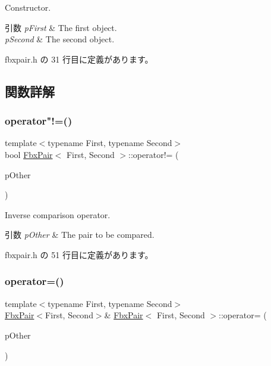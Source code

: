 Constructor. 
\begin{DoxyParams}{引数}
{\em p\+First} & The first object. \\
\hline
{\em p\+Second} & The second object. \\
\hline
\end{DoxyParams}


 fbxpair.\+h の 31 行目に定義があります。



\subsection{関数詳解}
\mbox{\label{class_fbx_pair_a6a08f9caa08c3bdd093951eeeaed31bf}} 
\subsubsection{\texorpdfstring{operator"!=()}{operator!=()}}
{\footnotesize\ttfamily template$<$typename First, typename Second$>$ \\
bool \hyperlink{class_fbx_pair}{Fbx\+Pair}$<$ First, Second $>$\+::operator!= (\begin{DoxyParamCaption}\item[{const \hyperlink{class_fbx_pair}{Fbx\+Pair}$<$ First, Second $>$ \&}]{p\+Other }\end{DoxyParamCaption})\hspace{0.3cm}{\ttfamily [inline]}}

Inverse comparison operator. 
\begin{DoxyParams}{引数}
{\em p\+Other} & The pair to be compared. \\
\hline
\end{DoxyParams}


 fbxpair.\+h の 51 行目に定義があります。

\mbox{\label{class_fbx_pair_ab645f08678477ba9b74c08ff5d61bf52}} 
\subsubsection{\texorpdfstring{operator=()}{operator=()}}
{\footnotesize\ttfamily template$<$typename First, typename Second$>$ \\
\hyperlink{class_fbx_pair}{Fbx\+Pair}$<$First, Second$>$\& \hyperlink{class_fbx_pair}{Fbx\+Pair}$<$ First, Second $>$\+::operator= (\begin{DoxyParamCaption}\item[{const \hyperlink{class_fbx_pair}{Fbx\+Pair}$<$ First, Second $>$ \&}]{p\+Other }\end{DoxyParamCaption})\hspace{0.3cm}{\ttfamily [inline]}}

